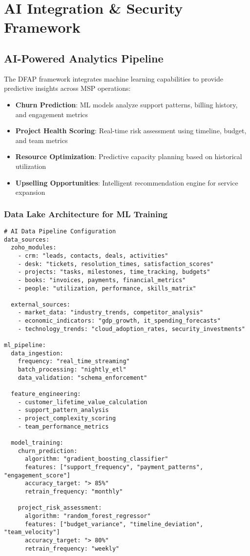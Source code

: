 \section{AI Integration \& Security Framework}

\subsection{AI-Powered Analytics Pipeline}

The DFAP framework integrates machine learning capabilities to provide predictive insights across MSP operations:

\begin{itemize}
  \item \textbf{Churn Prediction}: ML models analyze support patterns, billing history, and engagement metrics
  \item \textbf{Project Health Scoring}: Real-time risk assessment using timeline, budget, and team metrics
  \item \textbf{Resource Optimization}: Predictive capacity planning based on historical utilization
  \item \textbf{Upselling Opportunities}: Intelligent recommendation engine for service expansion
\end{itemize}

\subsubsection{Data Lake Architecture for ML Training}

\begin{verbatim}
# AI Data Pipeline Configuration
data_sources:
  zoho_modules:
    - crm: "leads, contacts, deals, activities"
    - desk: "tickets, resolution_times, satisfaction_scores"
    - projects: "tasks, milestones, time_tracking, budgets"
    - books: "invoices, payments, financial_metrics"
    - people: "utilization, performance, skills_matrix"
    
  external_sources:
    - market_data: "industry_trends, competitor_analysis"
    - economic_indicators: "gdp_growth, it_spending_forecasts"
    - technology_trends: "cloud_adoption_rates, security_investments"

ml_pipeline:
  data_ingestion:
    frequency: "real_time_streaming"
    batch_processing: "nightly_etl"
    data_validation: "schema_enforcement"
    
  feature_engineering:
    - customer_lifetime_value_calculation
    - support_pattern_analysis
    - project_complexity_scoring
    - team_performance_metrics
    
  model_training:
    churn_prediction:
      algorithm: "gradient_boosting_classifier"
      features: ["support_frequency", "payment_patterns", "engagement_score"]
      accuracy_target: "> 85%"
      retrain_frequency: "monthly"
      
    project_risk_assessment:
      algorithm: "random_forest_regressor"
      features: ["budget_variance", "timeline_deviation", "team_velocity"]
      accuracy_target: "> 80%"
      retrain_frequency: "weekly"
\end{verbatim}

